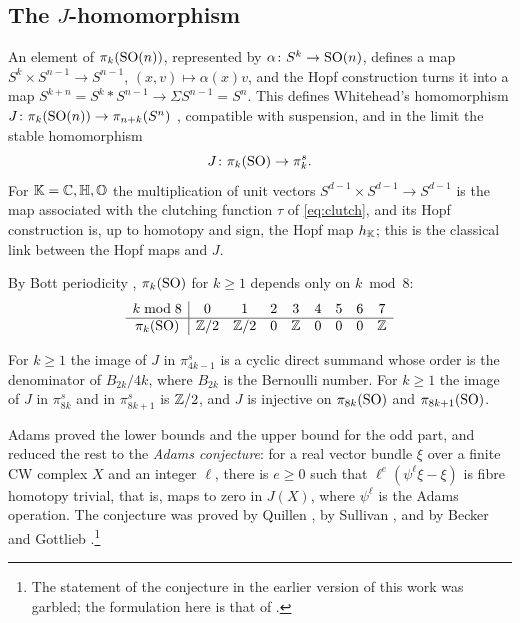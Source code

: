 \subsection{The \texorpdfstring{$J$}{J}-homomorphism}\label{sec:J}

An element of $\pi_k(\mathrm{SO}(n))$, represented by $\alpha\colon S^k\to\mathrm{SO}(n)$, defines a map $S^k\times S^{n-1}\to S^{n-1}$, $(x,v)\mapsto\alpha(x)v$, and the Hopf construction turns it into a map $S^{k+n}=S^k*S^{n-1}\to\Sigma S^{n-1}=S^n$. This defines Whitehead's homomorphism $J\colon\pi_k(\mathrm{SO}(n))\to\pi_{n+k}(S^n)$ \cite{Whi42}, compatible with suspension, and in the limit the stable homomorphism
\[
J\colon\pi_k(\mathrm{SO})\to\pi_k^s .
\]
For $\mathbb{K}=\mathbb{C},\mathbb{H},\mathbb{O}$ the multiplication of unit vectors $S^{d-1}\times S^{d-1}\to S^{d-1}$ is the map associated with the clutching function $\tau$ of \eqref{eq:clutch}, and its Hopf construction is, up to homotopy and sign, the Hopf map $h_{\mathbb{K}}$; this is the classical link between the Hopf maps and $J$.

By Bott periodicity \cite{Bot59}, $\pi_k(\mathrm{SO})$ for $k\ge1$ depends only on $k\bmod8$:
\[
\begin{array}{c|cccccccc}
k\bmod 8 & 0&1&2&3&4&5&6&7\\\hline
\pi_k(\mathrm{SO}) & \mathbb{Z}/2&\mathbb{Z}/2&0&\mathbb{Z}&0&0&0&\mathbb{Z}
\end{array}
\]

\begin{theorem}\label{thm:imJ}
For $k\ge1$ the image of $J$ in $\pi_{4k-1}^s$ is a cyclic direct summand whose order is the denominator of $B_{2k}/4k$, where $B_{2k}$ is the Bernoulli number. For $k\ge1$ the image of $J$ in $\pi_{8k}^s$ and in $\pi_{8k+1}^s$ is $\mathbb{Z}/2$, and $J$ is injective on $\pi_{8k}(\mathrm{SO})$ and $\pi_{8k+1}(\mathrm{SO})$.
\end{theorem}

Adams \cite{Ada66} proved the lower bounds and the upper bound for the odd part, and reduced the rest to the \emph{Adams conjecture}: for a real vector bundle $\xi$ over a finite CW complex $X$ and an integer $\ell$, there is $e\ge0$ such that $\ell^e(\psi^\ell\xi-\xi)$ is fibre homotopy trivial, that is, maps to zero in $J(X)$, where $\psi^\ell$ is the Adams operation. The conjecture was proved by Quillen \cite{Qui71}, by Sullivan \cite{Sul74}, and by Becker and Gottlieb \cite{BG75}.\footnote{The statement of the conjecture in the earlier version of this work was garbled; the formulation here is that of \cite{Ada66}.}

